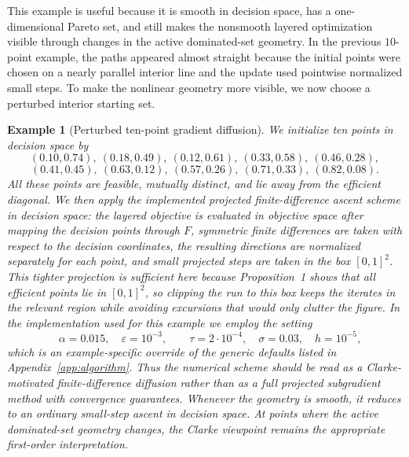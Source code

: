 \documentclass{article}
\newtheorem{example}{Example}
\begin{document}
This example is useful because it is smooth in decision space, has a one-dimensional Pareto set, and still makes the nonsmooth layered optimization visible through changes in the active dominated-set geometry. In the previous $10$-point example, the paths appeared almost straight because the initial points were chosen on a nearly parallel interior line and the update used pointwise normalized small steps. To make the nonlinear geometry more visible, we now choose a perturbed interior starting set.

\begin{example}[Perturbed ten-point gradient diffusion]
We initialize ten points in decision space by
\[
(0.10,0.74),\ (0.18,0.49),\ (0.12,0.61),\ (0.33,0.58),\ (0.46,0.28),
\]
\[
(0.41,0.45),\ (0.63,0.12),\ (0.57,0.26),\ (0.71,0.33),\ (0.82,0.08).
\]
All these points are feasible, mutually distinct, and lie away from the efficient diagonal. We then apply the implemented projected finite-difference ascent scheme in decision space: the layered objective is evaluated in objective space after mapping the decision points through $F$, symmetric finite differences are taken with respect to the decision coordinates, the resulting directions are normalized separately for each point, and small projected steps are taken in the box $[0,1]^2$. This tighter projection is sufficient here because Proposition~1 shows that all efficient points lie in $[0,1]^2$, so clipping the run to this box keeps the iterates in the relevant region while avoiding excursions that would only clutter the figure. In the implementation used for this example we employ the setting
\[
\quad \alpha=0.015,\quad \varepsilon=10^{-3},\qquad \tau=2\cdot 10^{-4},\quad \sigma=0.03,\quad h=10^{-5},
\]
which is an example-specific override of the generic defaults listed in Appendix~\ref{app:algorithm}. Thus the numerical scheme should be read as a Clarke-motivated finite-difference diffusion rather than as a full projected subgradient method with convergence guarantees. Whenever the geometry is smooth, it reduces to an ordinary small-step ascent in decision space. At points where the active dominated-set geometry changes, the Clarke viewpoint remains the appropriate first-order interpretation.
\end{example}
\end{document}

